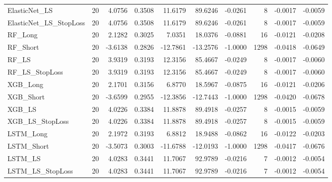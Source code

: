 \begin{tabular}{llrrrrrrrr}
\cline{1-10}
ElasticNet\_LS & 20 & 4.0756 & 0.3508 & 11.6179 & 89.6246 & -0.0261 & 8 & -0.0017 & -0.0059 \\
\cline{1-10}
ElasticNet\_LS\_StopLoss & 20 & 4.0756 & 0.3508 & 11.6179 & 89.6246 & -0.0261 & 8 & -0.0017 & -0.0059 \\
\cline{1-10}
RF\_Long & 20 & 2.1282 & 0.3025 & 7.0351 & 18.0376 & -0.0881 & 16 & -0.0121 & -0.0208 \\
\cline{1-10}
RF\_Short & 20 & -3.6138 & 0.2826 & -12.7861 & -13.2576 & -1.0000 & 1298 & -0.0418 & -0.0649 \\
\cline{1-10}
RF\_LS & 20 & 3.9319 & 0.3193 & 12.3156 & 85.4667 & -0.0249 & 8 & -0.0017 & -0.0060 \\
\cline{1-10}
RF\_LS\_StopLoss & 20 & 3.9319 & 0.3193 & 12.3156 & 85.4667 & -0.0249 & 8 & -0.0017 & -0.0060 \\
\cline{1-10}
XGB\_Long & 20 & 2.1701 & 0.3156 & 6.8770 & 18.5967 & -0.0875 & 16 & -0.0121 & -0.0206 \\
\cline{1-10}
XGB\_Short & 20 & -3.6599 & 0.2955 & -12.3856 & -12.7443 & -1.0000 & 1298 & -0.0420 & -0.0678 \\
\cline{1-10}
XGB\_LS & 20 & 4.0226 & 0.3384 & 11.8878 & 89.4918 & -0.0257 & 8 & -0.0015 & -0.0059 \\
\cline{1-10}
XGB\_LS\_StopLoss & 20 & 4.0226 & 0.3384 & 11.8878 & 89.4918 & -0.0257 & 8 & -0.0015 & -0.0059 \\
\cline{1-10}
LSTM\_Long & 20 & 2.1972 & 0.3193 & 6.8812 & 18.9488 & -0.0862 & 16 & -0.0122 & -0.0203 \\
\cline{1-10}
LSTM\_Short & 20 & -3.5073 & 0.3003 & -11.6788 & -12.0193 & -1.0000 & 1298 & -0.0417 & -0.0676 \\
\cline{1-10}
LSTM\_LS & 20 & 4.0283 & 0.3441 & 11.7067 & 92.9789 & -0.0216 & 7 & -0.0012 & -0.0054 \\
\cline{1-10}
LSTM\_LS\_StopLoss & 20 & 4.0283 & 0.3441 & 11.7067 & 92.9789 & -0.0216 & 7 & -0.0012 & -0.0054 \\
\cline{1-10}
\bottomrule
\end{tabular}
